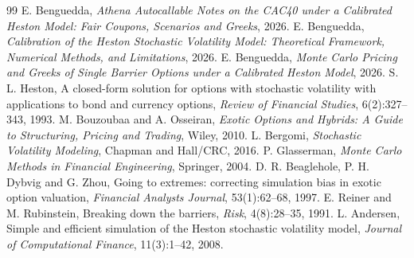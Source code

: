 \documentclass[11pt,a4paper]{article}
\begin{document}
\begin{thebibliography}{99}
 E. Benguedda, \emph{Athena Autocallable Notes on the CAC40 under a Calibrated Heston
Model: Fair Coupons, Scenarios and Greeks}, 2026.
 E. Benguedda, \emph{Calibration of the Heston Stochastic Volatility Model: Theoretical
Framework, Numerical Methods, and Limitations}, 2026.
 E. Benguedda, \emph{Monte Carlo Pricing and Greeks of Single Barrier Options under a
Calibrated Heston Model}, 2026.
 S. L. Heston, A closed-form solution for options with stochastic volatility with applications
to bond and currency options, \emph{Review of Financial Studies}, 6(2):327--343, 1993.
 M. Bouzoubaa and A. Osseiran, \emph{Exotic Options and Hybrids: A Guide to Structuring,
Pricing and Trading}, Wiley, 2010.
 L. Bergomi, \emph{Stochastic Volatility Modeling}, Chapman and Hall/CRC, 2016.
 P. Glasserman, \emph{Monte Carlo Methods in Financial Engineering}, Springer, 2004.
 D. R. Beaglehole, P. H. Dybvig and G. Zhou, Going to extremes: correcting simulation bias
in exotic option valuation, \emph{Financial Analysts Journal}, 53(1):62--68, 1997.
 E. Reiner and M. Rubinstein, Breaking down the barriers, \emph{Risk}, 4(8):28--35, 1991.
 L. Andersen, Simple and efficient simulation of the Heston stochastic volatility model,
\emph{Journal of Computational Finance}, 11(3):1--42, 2008.
\end{thebibliography}
\end{document}
